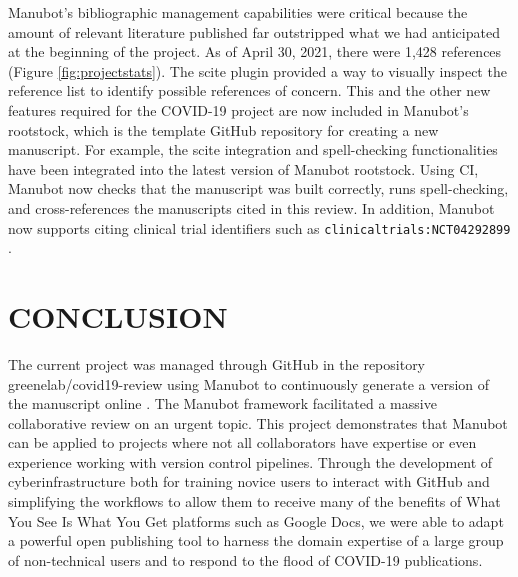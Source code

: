 \documentclass[sigconf]{acmart}
\begin{document}
Manubot's bibliographic management capabilities were critical because the amount of relevant literature published far outstripped what we had anticipated at the beginning of the project.
As of April 30, 2021, there were 1,428 references (Figure \ref{fig:projectstats}).
The scite plugin provided a way to visually inspect the reference list to identify possible references of concern.
This and the other new features required for the COVID-19 project are now included in Manubot's rootstock, which is the template GitHub repository for creating a new manuscript.
For example, the scite integration and spell-checking functionalities have been integrated into the latest version of Manubot rootstock.
Using CI, Manubot now checks that the manuscript was built correctly, runs spell-checking, and cross-references the manuscripts cited in this review.
In addition, Manubot now supports citing clinical trial identifiers such as \texttt{clinicaltrials:NCT04292899} \citep{yTCAmOyt}.

\hypertarget{discussion}{%
\section{CONCLUSION}\label{discussion}}

The current project was managed through GitHub in the repository greenelab/covid19-review using Manubot \citep{YuJbg3zO} to continuously generate a version of the manuscript online \citep{yTsmmAYC}.
The Manubot framework facilitated a massive collaborative review on an urgent topic.
This project demonstrates that Manubot can be applied to projects where not all collaborators have expertise or even experience working with version control pipelines.
Through the development of cyberinfrastructure both for training novice users to interact with GitHub and simplifying the workflows to allow them to receive many of the benefits of What You See Is What You Get platforms such as Google Docs, we were able to adapt a powerful open publishing tool to harness the domain expertise of a large group of non-technical users and to respond to the flood of COVID-19 publications.
\end{document}
